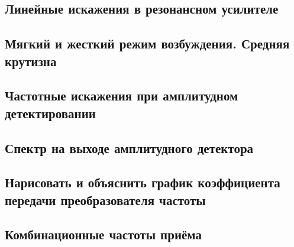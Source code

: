\documentclass[a4paper,14pt]{extarticle}
\theoremstyle{definition}
\begin{document}
\subsection{Линейные искажения в резонансном усилителе}

\subsection{Мягкий и жесткий режим возбуждения. Средняя крутизна}

\subsection{Частотные искажения при амплитудном детектировании}
\newpage
\subsection{Спектр на выходе амплитудного детектора}

\subsection{Нарисовать и объяснить график коэффициента передачи преобразователя частоты}

\subsection{Комбинационные частоты приёма}
\end{document}
